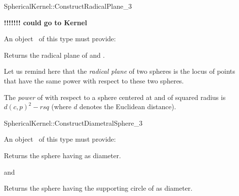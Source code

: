 \begin{ccRefFunctionObjectConcept}{SphericalKernel::ConstructRadicalPlane_3}

\textbf{!!!!!!! could go to Kernel}

An object \ccVar\ of this type must provide:

{Returns the radical plane of  and .}

Let us remind here that the \textit{radical plane} of two spheres is the 
locus of points  that have the same power with respect 
to these two spheres.

The \textit{power} of  with respect to a sphere  centered at 
 and of squared radius  is $ d(c,p)^2 - rsq $
(where $d$ denotes the Euclidean distance). 

\end{ccRefFunctionObjectConcept}
\begin{ccRefFunctionObjectConcept}{SphericalKernel::ConstructDiametralSphere_3}

An object \ccVar\ of this type must provide:

{Returns the sphere having  as diameter.}

and

{Returns the sphere having the supporting circle of  as diameter.}

\end{ccRefFunctionObjectConcept}

